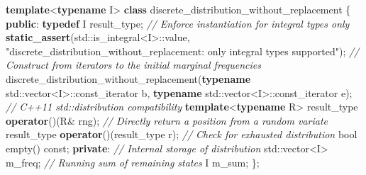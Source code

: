 \documentclass{JASSS}
\newenvironment{Shaded}{\begin{snugshade}}{\end{snugshade}}
\newcommand{\KeywordTok}[1]{\textcolor[rgb]{0.13,0.29,0.53}{\textbf{{#1}}}}
\newcommand{\DataTypeTok}[1]{\textcolor[rgb]{0.13,0.29,0.53}{{#1}}}
\newcommand{\StringTok}[1]{\textcolor[rgb]{0.31,0.60,0.02}{{#1}}}
\newcommand{\CommentTok}[1]{\textcolor[rgb]{0.56,0.35,0.01}{\textit{{#1}}}}
\newcommand{\NormalTok}[1]{{#1}}
\begin{document}
\begin{Shaded}
\begin{Highlighting}[]
  \KeywordTok{template}\NormalTok{<}\KeywordTok{typename} \NormalTok{I> }
  \KeywordTok{class} \NormalTok{discrete_distribution_without_replacement}
  \NormalTok{\{}
  \KeywordTok{public}\NormalTok{:}
    \KeywordTok{typedef} \NormalTok{I result_type;}
    \CommentTok{// Enforce instantiation for integral types only}
    \KeywordTok{static_assert}\NormalTok{(std::is_integral<I>::value, }
      \StringTok{"discrete_distribution_without_replacement: only integral types supported"}\NormalTok{);}
    \CommentTok{// Construct from iterators to the initial marginal frequencies}
    \NormalTok{discrete_distribution_without_replacement(}\KeywordTok{typename} \NormalTok{std::vector<I>::const_iterator b, }
                                              \KeywordTok{typename} \NormalTok{std::vector<I>::const_iterator e);}
    \CommentTok{// C++11 std::distribution compatibility}
    \KeywordTok{template}\NormalTok{<}\KeywordTok{typename} \NormalTok{R>} \NormalTok{result_type }\KeywordTok{operator}\NormalTok{()(R& rng);}
    \CommentTok{// Directly return a position from a random variate}    
    \NormalTok{result_type }\KeywordTok{operator}\NormalTok{()(result_type r);}
    \CommentTok{// Check for exhausted distribution}        
    \DataTypeTok{bool} \NormalTok{empty() }\DataTypeTok{const}\NormalTok{;}
  \KeywordTok{private}\NormalTok{:}
    \CommentTok{// Internal storage of distribution}          
    \NormalTok{std::vector<I> m_freq;}
    \CommentTok{// Running sum of remaining states}        
    \NormalTok{I m_sum;}
  \NormalTok{\};}
\end{Highlighting}
\end{Shaded}





 


\end{document}
